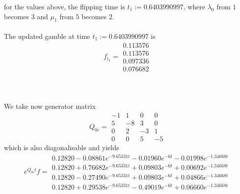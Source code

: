 \documentclass{article}
\begin{document}
for the values above, the flipping time is $t_{1}:= 0.6403990997$, where $\lambda_{0}$ from $1$ becomes $3$ and $\mu_{1}$ from $5$ becomes $2$.\\\\
The updated gamble at time $t_{1}:= 0.6403990997$ is
\begin{equation} \label{eq:ind_s1_4_f1}
 f_{t_1}= 
 \begin{array}{|c|}
  0.113576\\
  0.113576\\
  0.097336\\
  0.076682  
 \end{array}
 \end{equation}\\\\\\
We take now generator matrix 
\begin{equation*} 
 Q_{0c}= 
 \begin{array}{|rrrr|}
  -1 & 1 & 0 & 0 \\
  5 & -8 & 3 & 0 \\
  0 & 2 & -3 & 1 \\
  0 & 0 & 5 & -5 
 \end{array}
 \end{equation*}
 which is also diagonalisable and yields
\begin{equation*} 
 e^{Q_{0c}t}f= 
 \begin{array}{|r|}
  0.12820-0.08861e^{-9.65331t}- 0.01960e^{-6t}- 0.01998e^{-1.34668t}\\
  0.12820+0.76682e^{-9.65331t}+ 0.09803e^{-6t}+ 0.00692e^{-1.34668t}\\
  0.12820-0.27490e^{-9.65331t}+ 0.09803e^{-6t}+ 0.04866e^{-1.34668t}\\
  0.12820+0.29538e^{-9.65331t}- 0.49019e^{-6t}+ 0.06660e^{-1.34668t}  
 \end{array}
 \end{equation*}
\end{document}

